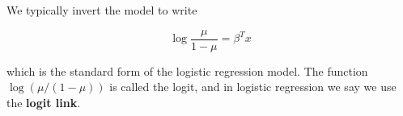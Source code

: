 We typically invert the model to write

$$ \log{\frac{\mu}{1-\mu}} = \beta^T x $$

which is the standard form of the logistic regression model. The function $\log \left( \mu/(1-\mu) \right)$ is called the logit, and in logistic regression we say we use the \textbf{logit link}.

\newpage


